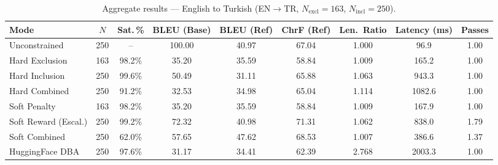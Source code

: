 \documentclass{tlp}
\begin{document}
\begin{table}[htbp]
  \centering
  \caption{Aggregate results --- English to Turkish (EN$\rightarrow$TR,
    $N_{\text{excl}}=163$, $N_{\text{incl}}=250$).}
  \label{tab:results_en_tr}
  {\small
    \setlength{\tabcolsep}{2pt}
    \begin{tabular}{lcccccccc}
      \toprule
      Mode & $N$ & Sat.\,\% & BLEU (Base) & BLEU (Ref) & ChrF (Ref) &
        Len.\ Ratio & Latency (ms) & Passes \\
      \midrule
      Unconstrained        & 250 & --     & 100.00 & 40.97 & 67.04 & 1.000 & \phantom{0}96.9  & 1.00 \\
      \midrule
      Hard Exclusion       & 163 & 98.2\% & \phantom{0}35.20 & 35.59 & 58.84 & 1.009 & \phantom{00}165.2 & 1.00 \\
      Hard Inclusion       & 250 & 99.6\% & \phantom{0}50.49 & 31.11 & 65.88 & 1.063 & \phantom{00}943.3 & 1.00 \\
      Hard Combined        & 250 & 91.2\% & \phantom{0}32.53 & 34.98 & 65.04 & 1.114 & 1082.6 & 1.00 \\
      \midrule
      Soft Penalty         & 163 & 98.2\% & \phantom{0}35.20 & 35.59 & 58.84 & 1.009 & \phantom{00}167.9 & 1.00 \\
      Soft Reward (Escal.) & 250 & 99.2\% & \phantom{0}72.32 & 40.98 & 71.31 & 1.062 & \phantom{00}838.0 & 1.79 \\
      Soft Combined        & 250 & 62.0\% & \phantom{0}57.65 & 47.62 & 68.53 & 1.007 & \phantom{00}386.6 & 1.37 \\
      \midrule
      HuggingFace DBA      & 250 & 97.6\% & \phantom{0}31.17 & 34.41 & 62.39 & 2.768 & 2003.3 & 1.00 \\
      \bottomrule
    \end{tabular}
  }
\end{table}
\end{document}
